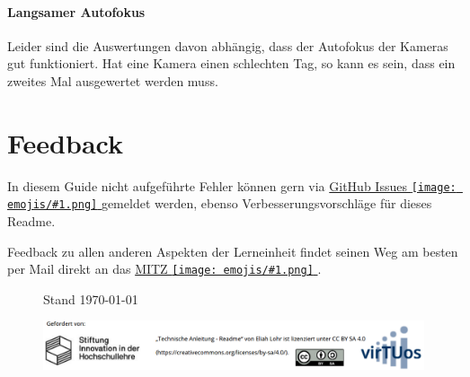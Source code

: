 \documentclass[a4paper, 10pt]{article}
\newcommand{\emoji}[1]{
    \begingroup\normalfont
    \texttt{[image: emojis/\#1.png]}
    \endgroup
}
\begin{document}
\paragraph{Langsamer Autofokus}
Leider sind die Auswertungen davon abhängig, dass der Autofokus der Kameras gut funktioniert. Hat eine Kamera einen schlechten Tag, so kann es sein, dass ein zweites Mal ausgewertet werden muss.


\section{Feedback}
In diesem Guide nicht aufgeführte Fehler können gern via \href{https://github.com/LeLoomi/hybparc_aruco/issues}{GitHub Issues\emoji{link}} gemeldet werden, ebenso Verbesserungsvorschläge für dieses Readme.

\noindent Feedback zu allen anderen Aspekten der Lerneinheit findet seinen Weg am besten per Mail direkt an das \href{https://tu-dresden.de/med/mf/mitz/daszentrum/kontakt}{MITZ\emoji{link}}.


\begin{figure}[b]
    \begin{flushleft}
        \hspace*{7.4mm}
        {\footnotesize Stand \today}
    \end{flushleft}
    \vspace{-3.3mm}
    \centering
    \includegraphics[width=14.61cm]{funding+license.png}
\end{figure}
\end{document}
